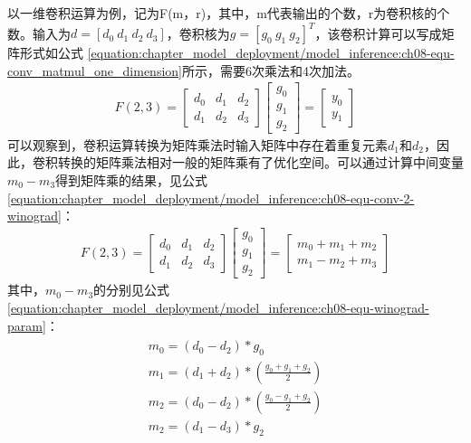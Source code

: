 \documentclass[letterpaper,10pt,english]{sphinxmanual}
\begin{document}
\sphinxAtStartPar
以一维卷积运算为例，记为F(m，r)，其中，m代表输出的个数，r为卷积核的个数。输入为\(d=[d_0 \ d_1 \ d_2 \ d_3]\)，卷积核为\(g=[g_0 \ g_1 \ g_2]^T\)，该卷积计算可以写成矩阵形式如公式
\eqref{equation:chapter_model_deployment/model_inference:ch08-equ-conv_matmul_one_dimension}所示，需要6次乘法和4次加法。
\begin{equation}\label{equation:chapter_model_deployment/model_inference:ch08-equ-conv_matmul_one_dimension}
\begin{split}F(2, 3)=\left[ \begin{matrix} d_0 & d_1 & d_2 \\ d_1 & d_2 & d_3 \end{matrix} \right] \left[ \begin{matrix} g_0 \\ g_1 \\ g_2 \end{matrix} \right]=\left[ \begin{matrix} y_0 \\ y_1 \end{matrix} \right]\end{split}
\end{equation}
\sphinxAtStartPar
可以观察到，卷积运算转换为矩阵乘法时输入矩阵中存在着重复元素\(d_1\)和\(d_2\)，因此，卷积转换的矩阵乘法相对一般的矩阵乘有了优化空间。可以通过计算中间变量\(m_0-m_3\)得到矩阵乘的结果，见公式
\eqref{equation:chapter_model_deployment/model_inference:ch08-equ-conv-2-winograd}：
\begin{equation}\label{equation:chapter_model_deployment/model_inference:ch08-equ-conv-2-winograd}
\begin{split}F(2, 3)=\left[ \begin{matrix} d_0 & d_1 & d_2 \\ d_1 & d_2 & d_3 \end{matrix} \right] \left[ \begin{matrix} g_0 \\ g_1 \\ g_2 \end{matrix} \right]=\left[ \begin{matrix} m_0+m_1+m_2 \\ m_1-m_2+m_3 \end{matrix} \right]\end{split}
\end{equation}
\sphinxAtStartPar
其中，\(m_0-m_3\)的分别见公式
\eqref{equation:chapter_model_deployment/model_inference:ch08-equ-winograd-param}：
\begin{equation}\label{equation:chapter_model_deployment/model_inference:ch08-equ-winograd-param}
\begin{split}\begin{aligned}m_0=(d_0-d_2)*g_0 \\m_1=(d_1+d_2)*(\frac{g_0+g_1+g_2}{2}) \\m_2=(d_0-d_2)*(\frac{g_0-g_1+g_2}{2}) \\m_2=(d_1-d_3)*g_2\end{aligned}\end{split}
\end{equation}
\end{document}
